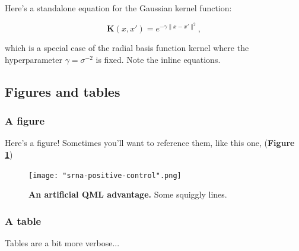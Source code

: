\documentclass[twocolumn]{article}
\begin{document}
Here's a standalone equation for the Gaussian kernel function:

\begin{equation}
    \mathbf{K}(x,x') = e^{-\gamma \| x-x' \|^2},
\end{equation}

which is a special case of the radial basis function kernel where the hyperparameter $\gamma = \sigma^{-2}$ is fixed. Note the inline equations. 

\subsection{Figures and tables}

\subsubsection{A figure}
Here's a figure! Sometimes you'll want to reference them, like this one, (\textbf{Figure \ref{fig:srna-positive-controls}})

\begin{figure}[!ht]
    \centering
    \texttt{[image: "srna-positive-control".png]}
    \caption[An artificial QML advantage]{\textbf{An artificial QML advantage.} Some squiggly lines.}
    \label{fig:srna-positive-controls}
\end{figure}

\subsubsection{A table}

Tables are a bit more verbose...
\end{document}
